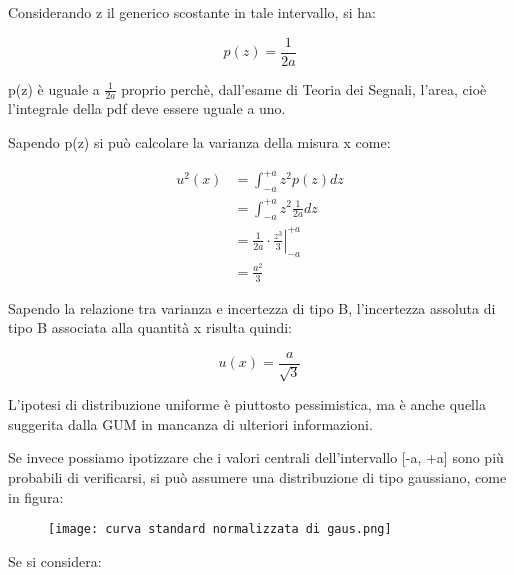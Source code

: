 Considerando z il generico scostante in tale intervallo, si ha:

{
    \Large
    \begin{equation}
        p(z) = \frac{1}{2a}
    \end{equation}
}

p(z) è uguale a $\frac{1}{2a}$ proprio perchè, dall'esame di Teoria dei Segnali, l'area, 
cioè l'integrale della pdf deve essere uguale a uno. \newline 

Sapendo p(z) si può calcolare la varianza della misura x come: 

{
    \Large 
    \begin{equation}
        \begin{split}
            u^{2} (x)
            &= 
            \int_{-a}^{+a} 
            z^{2} p(z) dz 
            \\
            &= 
            \int_{-a}^{+a}
            z^{2} \frac{1}{2a} dz 
            \\ 
            &= 
            \frac{1}{2a} \cdot 
            \left.
                \frac{z^{3}}{3}
            \right|^{+a}_{-a}
            \\
            &= 
            \frac{a^{2}}{3}
        \end{split}
    \end{equation}
} 

Sapendo la relazione tra varianza e incertezza di tipo B, 
l'incertezza assoluta di tipo B associata alla quantità x risulta quindi: 

{
    \Large 
    \begin{equation}
        u(x) = \frac{a}{\sqrt{3}}
    \end{equation}
}


L'ipotesi di distribuzione uniforme è piuttosto pessimistica, ma è anche quella suggerita dalla GUM in mancanza di ulteriori informazioni. \newline 

Se invece possiamo ipotizzare che i valori centrali dell'intervallo [-a, +a] sono più probabili di verificarsi, 
si può assumere una distribuzione di tipo gaussiano, come in figura: 


\begin{figure}[h]
    \centering
    \texttt{[image: curva standard normalizzata di gaus.png]}
\end{figure}

Se si considera: 

